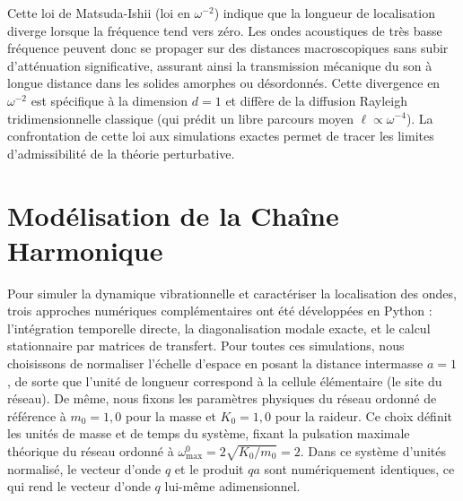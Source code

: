 \documentclass[11pt, a4paper, twoside]{article}
\begin{document}
Cette loi de Matsuda-Ishii (loi en $\omega^{-2}$) indique que la longueur de localisation diverge lorsque la fréquence tend vers zéro. Les ondes acoustiques de très basse fréquence peuvent donc se propager sur des distances macroscopiques sans subir d'atténuation significative, assurant ainsi la transmission mécanique du son à longue distance dans les solides amorphes ou désordonnés. Cette divergence en $\omega^{-2}$ est spécifique à la dimension $d=1$ et diffère de la diffusion Rayleigh tridimensionnelle classique (qui prédit un libre parcours moyen $\ell \propto \omega^{-4}$). La confrontation de cette loi aux simulations exactes permet de tracer les limites d'admissibilité de la théorie perturbative.

\section{Modélisation de la Chaîne Harmonique}

Pour simuler la dynamique vibrationnelle et caractériser la localisation des ondes, trois approches numériques complémentaires ont été développées en Python : l'intégration temporelle directe, la diagonalisation modale exacte, et le calcul stationnaire par matrices de transfert. Pour toutes ces simulations, nous choisissons de normaliser l'échelle d'espace en posant la distance intermasse $a = 1$, de sorte que l'unité de longueur correspond à la cellule élémentaire (le site du réseau). De même, nous fixons les paramètres physiques du réseau ordonné de référence à $m_0 = 1{,}0$ pour la masse et $K_0 = 1{,}0$ pour la raideur. Ce choix définit les unités de masse et de temps du système, fixant la pulsation maximale théorique du réseau ordonné à $\omega_{\max}^0 = 2\sqrt{K_0/m_0} = 2$. Dans ce système d'unités normalisé, le vecteur d'onde $q$ et le produit $qa$ sont numériquement identiques, ce qui rend le vecteur d'onde $q$ lui-même adimensionnel.


\FloatBarrier
\end{document}
